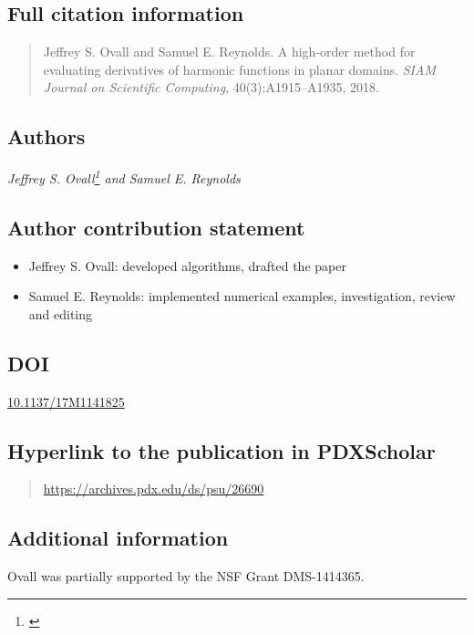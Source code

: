 \subsection*{Full citation information}
  \singlespacing
  \begin{quote}
    Jeffrey S. Ovall and Samuel E. Reynolds.
    A high-order method for evaluating derivatives of harmonic functions in planar domains.
    \textit{SIAM Journal on Scientific Computing}, 40(3):A1915--A1935, 2018.
  \end{quote}
  \doublespacing

\subsection*{Authors}
  \textit{Jeffrey S. Ovall\footnote{\label{PSU-affil-1}\PSU} and
  Samuel E. Reynolds}

\subsection*{Author contribution statement}
  \singlespacing
  \begin{itemize}
    \item Jeffrey S. Ovall:  developed algorithms, drafted the paper
    \item Samuel E. Reynolds: implemented numerical examples, investigation, review and editing
  \end{itemize}
  \doublespacing

\subsection*{DOI}
  \href{https://doi.org/10.1137/17M1141825}{10.1137/17M1141825}

\subsection*{Hyperlink to the publication in PDXScholar}
  \begin{quote}
    \url{https://archives.pdx.edu/ds/psu/26690}
  \end{quote}

\subsection*{Additional information}
  Ovall was partially supported by the NSF Grant DMS-1414365.